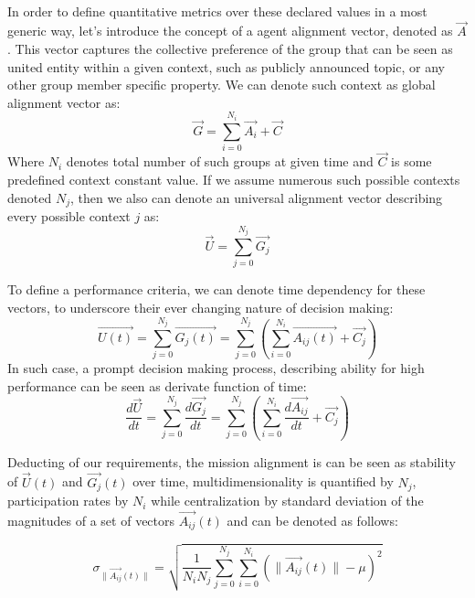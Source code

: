 \documentclass{article}
\begin{document}
\begin{CJK}{UTF8}{gbsn}
\begin{multicols}{2}
        \paragraph*{}
        In order to define quantitative metrics over these declared values in a most generic way, let's introduce the concept of a agent alignment vector, denoted as  $\vec{A}$. This vector captures the collective preference of the group that can be seen as united entity within a given context, such as publicly announced topic, or any other group member specific property. We can denote such context as global alignment vector as:
        \begin{equation}
            \label{eq:glob-align}
            \vec{G} = \sum_{i=0}^{N_{i}} \vec{A_i} + \vec{C}
        \end{equation} Where $N_i$ denotes total number of such groups at given time and $\vec{C}$ is some predefined context constant value.
        If we assume numerous such possible contexts denoted ${N_j}$, then we also can denote an universal alignment vector describing every possible context $j$ as:
        \begin{equation}
            \vec{U} = \sum_{j=0}^{N_{j}} \vec{G_j}
        \end{equation}

        To define a performance criteria, we can denote time dependency for these vectors, to underscore their ever changing nature of decision making:
         \begin{equation}
            \vec{U(t)} = \sum_{j=0}^{N_{j}} \vec{G_j(t)} = \sum_{j=0}^{N_{j}}(\sum_{i=0}^{N_{i}} \vec{A_{ij}(t)} + \vec{C_j})
        \end{equation}
        In such case, a prompt decision making process,  describing ability for high performance can be seen as derivate function of time:
        \begin{equation}
        \frac{d\vec{U}}{dt} = \sum_{j=0}^{N_{j}} \frac{d\vec{G_j}}{dt} = \sum_{j=0}^{N_{j}} (\sum_{i=0}^{N_{i}} \frac{d\vec{A_{ij}}}{dt} + \vec{C_j})
        \end{equation}

        Deducting of our requirements, the mission alignment is can be seen as stability of $\vec{U}(t)$ and $\vec{G_j}(t)$ over time, multidimensionality is quantified by ${N_j}$,  participation rates by $N_i$ while centralization by standard deviation of the magnitudes of a set of vectors $\vec{A_{ij}}(t)$ and can be denoted as follows:

        \begin{equation}
            \sigma_{\|\vec{A_{ij}}(t)\|} = \sqrt{\frac{1}{N_{i}N_{j}} \sum_{j=0}^{N_{j}} \sum_{i=0}^{N_{i}} \left( \|\vec{A_{ij}}(t)\| - \mu \right)^2}
            \end{equation}


\end{multicols}
\end{CJK}
\end{document}
